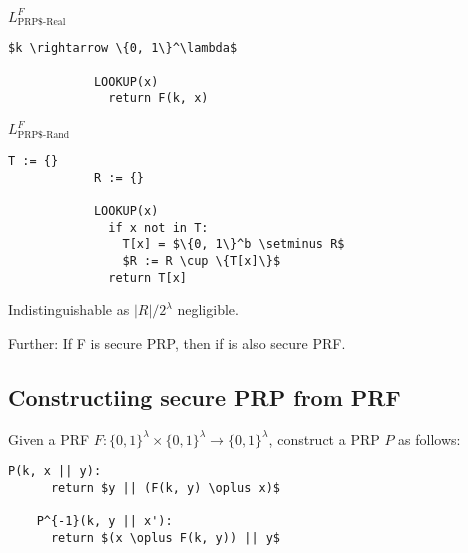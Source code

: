 \documentclass[a4paper]{scrreprt}
\begin{document}
\begin{tcbraster}[raster columns=2,raster equal height,nobeforeafter,raster column skip=2cm]
	\begin{library}{$L^F_{\text{PRP\$-Real}}$}
		\begin{lstlisting}[mathescape=true,autogobble=true]
			$k \rightarrow \{0, 1\}^\lambda$

			LOOKUP(x)
			  return F(k, x)
		\end{lstlisting}
	\end{library}
	\begin{library}{$L^F_{\text{PRP\$-Rand}}$}
		\begin{lstlisting}[mathescape=true,autogobble=true]
			T := {}
			R := {}

			LOOKUP(x)
			  if x not in T:
			    T[x] = $\{0, 1\}^b \setminus R$
			    $R := R \cup \{T[x]\}$
			  return T[x]
		\end{lstlisting}
	\end{library}
\end{tcbraster}

Indistinguishable as $|R| / 2^\lambda$ negligible.

Further: If F is secure PRP, then if is also secure PRF.

\subsection{Constructiing secure PRP from PRF}

Given a PRF $F: \{0, 1\}^\lambda \times \{0, 1\}^\lambda \rightarrow \{0,
1\}^\lambda$, construct a PRP $P$ as follows:

\begin{lstlisting}[mathescape=true,autogobble=true]
	P(k, x || y):
	  return $y || (F(k, y) \oplus x)$

	P^{-1}(k, y || x'):
	  return $(x \oplus F(k, y)) || y$
\end{lstlisting}
\end{document}
